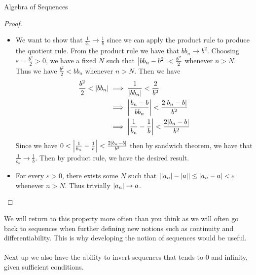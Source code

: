 \documentclass[a4paper]{article}
\begin{document}
\begin{prp}{Algebra of Sequences}{}
\begin{proof}
\begin{itemize}
\begin{align*}
\abs{a_nb_n-ab}&=\abs{(a_n-a)b_n+a(b_n-b)} \\
&\leq\abs{a_n-a}\abs{b_n}+\abs{a}\abs{b_n-b} \\
&\leq M\abs{a_n-a}+M\abs{b_n-b} \\
&<\frac{\varepsilon}{2}+\frac{\varepsilon}{2} \\
&=\varepsilon
\end{align*}
Thus we have the desired result. 
\item We want to show that $\frac{1}{b_n}\to\frac{1}{b}$ since we can apply the product rule to produce the quotient rule. From the product rule we have that $bb_n\to b^2$. Choosing $\varepsilon=\frac{b^2}{2}>0$, we have a fixed $N$ such that $\abs{bb_n-b^2}<\frac{b^2}{2}$ whenever $n>N$. Thus we have $\frac{b^2}{2}<bb_n$ whenever $n>N$. Then we have
\begin{align*}
\frac{b^2}{2}<\abs{bb_n}&\implies\frac{1}{\abs{bb_n}}<\frac{2}{b^2} \\
&\implies\abs{\frac{b_n-b}{bb_n}}<\frac{2\abs{b_n-b}}{b^2} \\
&\implies\abs{\frac{1}{b_n}-\frac{1}{b}}<\frac{2\abs{b_n-b}}{b^2}
\end{align*}
Since we have $0<\abs{\frac{1}{b_n}-\frac{1}{b}}<\frac{2\abs{b_n-b}}{b^2}$ then by sandwich theorem, we have that $\frac{1}{b_n}\to\frac{1}{b}$. Then by product rule, we have the desired result. 
\item For every $\varepsilon>0$, there exists some $N$ such that $\abs{\abs{a_n}-\abs{a}}\leq\abs{a_n-a}<\varepsilon$ whenever $n>N$. Thus trivially $\abs{a_n}\to a$. 
\end{itemize}
\end{proof}
\end{prp}

We will return to this property more often than you think as we will often go back to sequences when further defining new notions such as continuity and differentiability. This is why developing the notion of sequences would be useful. \\~\\
Next up we also have the ability to invert sequences that tends to $0$ and infinity, given sufficient conditions. 
\end{document}

